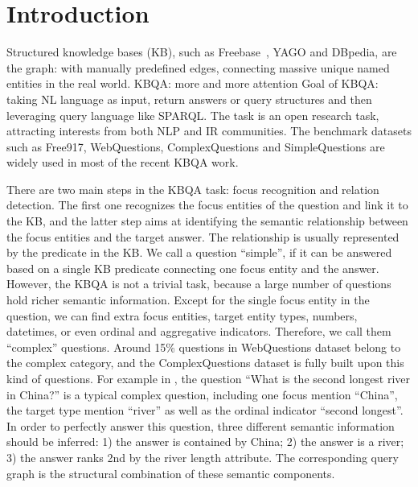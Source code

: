 \section{Introduction}




Structured knowledge bases (KB), such as Freebase~\cite{bollacker2008freebase}, YAGO and DBpedia,
are the graph: with manually predefined edges, connecting massive unique named entities in the real world.
KBQA: more and more attention
Goal of KBQA: taking NL language as input, return answers or query structures
and then leveraging query language like SPARQL.
The task is an open research task, attracting interests from both NLP and IR communities.
The benchmark datasets such as Free917, WebQuestions, ComplexQuestions and SimpleQuestions
are widely used in most of the recent KBQA work.

There are two main steps in the KBQA task: focus recognition and relation detection.
The first one recognizes the focus entities of the question and link it to the KB,
and the latter step aims at identifying the semantic relationship between the focus entities and the target answer.
The relationship is usually represented by the predicate in the KB.
We call a question ``simple'', if it can be answered based on a single KB predicate connecting
one focus entity and the answer.
However, the KBQA is not a trivial task, because a large number of questions
hold richer semantic information.
Except for the single focus entity in the question,
we can find extra focus entities, target entity types, numbers, datetimes,
or even ordinal and aggregative indicators.
Therefore, we call them ``complex'' questions.
Around 15\% questions in WebQuestions dataset belong to the complex category,
and the ComplexQuestions dataset is fully built upon this kind of questions.
For example in ,
the question ``What is the second longest river in China?'' is a typical complex question,
including one focus mention ``China'', the target type mention ``river''
as well as the ordinal indicator ``second longest''.
In order to perfectly answer this question, three different semantic information should be inferred:
1) the answer is contained by China;
2) the answer is a river;
3) the answer ranks 2nd by the river length attribute.
The corresponding query graph is the structural combination of these semantic components.

